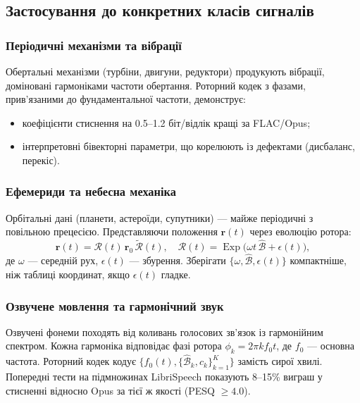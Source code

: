\documentclass[11pt,a4paper]{article}
\newcommand{\rev}[1]{\widetilde{#1}}           %
\newcommand{\Exp}{\operatorname{Exp}}
\newcommand{\Rotor}{\mathcal{R}}
\newcommand{\Biv}{\mathcal{B}}
\theoremstyle{definition}
\theoremstyle{plain}
\theoremstyle{remark}
\begin{document}
\subsection{Застосування до конкретних класів сигналів}

\subsubsection{Періодичні механізми та вібрації}

Обертальні механізми (турбіни, двигуни, редуктори) продукують вібрації, доміновані гармоніками частоти обертання. Роторний кодек з фазами, прив’язаними до фундаментальної частоти, демонструє:
\begin{itemize}
  \item коефіцієнти стиснення на 0.5–1.2 біт/відлік кращі за FLAC/Opus;
  \item інтерпретовні бівекторні параметри, що корелюють із дефектами (дисбаланс, перекіс).
\end{itemize}

\subsubsection{Ефемериди та небесна механіка}

Орбітальні дані (планети, астероїди, супутники) — майже періодичні з повільною прецесією. Представляючи положення $\mathbf{r}(t)$ через еволюцію ротора:
\begin{equation}
\mathbf{r}(t) = \Rotor(t)\, \mathbf{r}_0\, \rev{\Rotor}(t), \quad \Rotor(t) = \Exp\!\big(\omega t\, \hat{\Biv} + \epsilon(t)\big),
\end{equation}
де $\omega$ — середній рух, $\epsilon(t)$ — збурення. Зберігати $\{\omega, \hat{\Biv}, \epsilon(t)\}$ компактніше, ніж таблиці координат, якщо $\epsilon(t)$ гладке.

\subsubsection{Озвучене мовлення та гармонічний звук}

Озвучені фонеми походять від коливань голосових зв’язок із гармонійним спектром. Кожна гармоніка відповідає фазі ротора $\phi_k = 2\pi k f_0 t$, де $f_0$ — основна частота. Роторний кодек кодує $\{f_0(t), \{\hat{\Biv}_k, c_k\}_{k=1}^K\}$ замість сирої хвилі. Попередні тести на підмножинах LibriSpeech показують 8–15\% виграш у стисненні відносно Opus за тієї ж якості (PESQ $\ge 4.0$).
\end{document}
